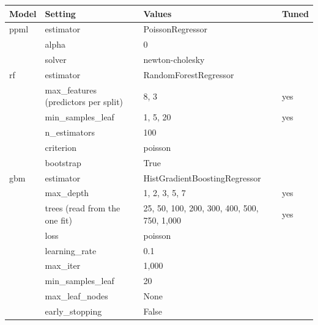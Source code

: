 \begin{tabular}{llll}
\toprule
Model & Setting & Values & Tuned \\
\midrule
ppml & estimator & PoissonRegressor &  \\
 & alpha & 0 &  \\
 & solver & newton-cholesky &  \\
rf & estimator & RandomForestRegressor &  \\
 & max\_features (predictors per split) & 8, 3 & yes \\
 & min\_samples\_leaf & 1, 5, 20 & yes \\
 & n\_estimators & 100 &  \\
 & criterion & poisson &  \\
 & bootstrap & True &  \\
gbm & estimator & HistGradientBoostingRegressor &  \\
 & max\_depth & 1, 2, 3, 5, 7 & yes \\
 & trees (read from the one fit) & 25, 50, 100, 200, 300, 400, 500, 750, 1,000 & yes \\
 & loss & poisson &  \\
 & learning\_rate & 0.1 &  \\
 & max\_iter & 1,000 &  \\
 & min\_samples\_leaf & 20 &  \\
 & max\_leaf\_nodes & None &  \\
 & early\_stopping & False &  \\
\bottomrule
\end{tabular}
